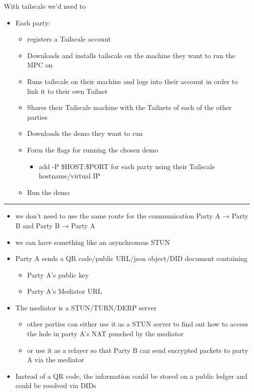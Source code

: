 With tailscale we'd need to

\begin{itemize}
\tightlist
\item
  Each party:

  \begin{itemize}
  \tightlist
  \item
    registers a Tailscale account
  \item
    Downloads and installs tailscale on the machine they want to run the MPC on
  \item
    Runs tailscale on their machine and logs into their account in order to link it to their own Tailnet
  \item
    Shares their Tailscale machine with the Tailnets of each of the other parties
  \item
    Downloads the demo they want to run
  \item
    Form the flags for running the chosen demo

    \begin{itemize}
    \tightlist
    \item
      add -P \$HOST:\$PORT for each party using their Tailscale hostname/virtual IP
    \end{itemize}
  \item
    Run the demo
  \end{itemize}
\end{itemize}

\begin{center}\rule{0.5\linewidth}{0.5pt}\end{center}

\begin{itemize}
\tightlist
\item
  we don't need to use the same route for the communication Party A → Party B and Party B → Party A
\item
  we can have something like an asynchronous STUN
\item
  Party A sends a QR code/public URL/json object/DID document containing

  \begin{itemize}
  \tightlist
  \item
    Party A's public key
  \item
    Party A's Mediator URL
  \end{itemize}
\item
  The mediator is a STUN/TURN/DERP server

  \begin{itemize}
  \tightlist
  \item
    other parties can either use it as a STUN server to find out how to access the hole in party A's NAT punched by the mediator
  \item
    or use it as a relayer so that Party B can send encrypted packets to party A via the mediator
  \end{itemize}
\item
  Instead of a QR code, the information could be stored on a public ledger and could be resolved via DIDs
\end{itemize}

